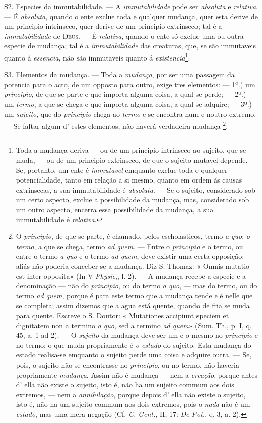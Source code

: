 S2. Especies da immutabilidade. --- A \emph{immutabilidade} pode ser \emph{absoluta} e \emph{relativa}. --- É \emph{absoluta}, quando o ente exclue toda e qualquer mudança, quer esta derive de um principio intrinseco, quer derive de um principio extrinseco; tal é a \emph{immutabilidade} de \textsc{Deus}. --- É \emph{relativa}, quando o ente só exclue uma ou outra especie de mudança; tal é a \emph{immutabilidade} das creaturas, que, se são immutaveis quanto á \emph{essencia}, não são immutaveis quanto á \emph{existencia}\footnote{Toda a mudança deriva --- ou de um principio intrinseco ao sujeito, que se muda, --- ou de um principio extrinseco, de que o sujeito mutavel depende. Se, portanto, um ente é \emph{immutavel} emquanto exclue toda e qualquer potencialidade, tanto em relação a si mesmo, quanto em ordem ás causas extrinsecas, a sua immutabilidade é \emph{absoluta}. --- Se o sujeito, considerado sob um certo aspecto, exclue a possibilidade da mudança, mas, considerado sob um outro aspecto, encerra essa possibilidade da mudança, a sua immutabilidade é \emph{relativa}.}.

S3. Elementos da mudança. --- Toda a \emph{mudança}, por ser uma passagem da potencia para o acto, de um opposto para   outro, exige tres elementos: --- 1º.) um \emph{principio}, de que se parte e que importa alguma coisa, a qual se perde; --- 2º.) um \emph{termo}, a que se chega e que importa alguma coisa, a qual se adquire; --- 3º.) um \emph{sujeito}, que do \emph{principio} chega ao \emph{termo} e se encontra num e noutro extremo. --- Se faltar algum d' estes elementos, não haverá verdadeira mudança \footnote{O \emph{principio}, de que se parte, é chamado, pelos escholasticos, termo \emph{a quo}; \emph{o termo}, a que se chega, termo \emph{ad quem}. --- Entre o \emph{principio} e o termo, ou entre o termo \emph{a quo} e o termo \emph{ad quem}, deve existir uma certa opposição; aliás não poderia conceber-se a mudança. Diz S. Thomaz: « Omnis mutatio est inter opposita» (In V \emph{Physic},, l. 2). --- A mudança recebe a especie e a denominação --- não do \emph{principio}, ou do termo \emph{a quo}, --- mas do termo, ou do termo \emph{ad quem}, porque é para este termo que a mudança tende e é nelle que se completa; assim dizemos que a agua está quente, quando de fria se muda para quente. Escreve o S. Doutor: « Mutationes accipiunt speciem et dignitatem non a termino \emph{a quo}, sed a termino \emph{ad quem}» (Sum. Th., p. I, q. 45, a. 1 ad 2). --- O \emph{sujeito} da mudança deve ser um e o mesmo no \emph{principio} e no termo; o que muda propriamente é \emph{o estado} do sujeito. Esta mudança do estado realisa-se emquanto o sujeito perde uma coisa e adquire outra. --- Se, pois, o sujeito não se encontrasse no \emph{principio}, ou no termo, não haveria propriamente \emph{mudança}. Assim não é mudança --- nem a \emph{creação}, porque antes d' ella não existe o sujeito, isto é, não ha um sujeito commum aos dois extremos, --- nem a \emph{annihilação}, porque depois d' ella não existe o sujeito, isto é, não ha um sujeito commum aos dois extremos, pois o \emph{nada} não é um \emph{estado}, mas uma mera negação (Cf. \emph{C. Gent.}, II, 17: \emph{De Pot.}, q. 3, a. 2).}.

